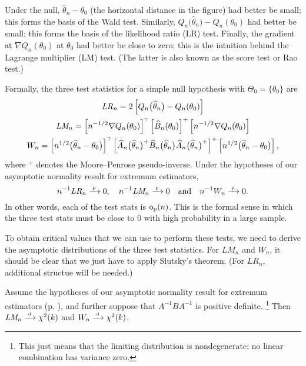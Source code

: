 \documentclass[11pt,letterpaper,reqno,oneside]{article}
\begin{document}
Under the null, $\widehat{\theta}_n-\theta_0$ (the horizontal distance in the figure) had better be small; this forms the basis of the Wald test. Similarly, $Q_n\bigl(\widehat{\theta}_n\bigr) - Q_n(\theta_0)$ had better be small; this forms the basis of the likelihood ratio (LR) test. Finally, the gradient at $\nabla Q_n(\theta_0)$ at $\theta_0$ had better be close to zero; this is the intuition behind the Lagrange multiplier (LM) test. (The latter is also known as the score test or Rao test.)

Formally, the three test statistics for a simple null hypothesis with $\Theta_0 = \{ \theta_0 \}$ are
%
\begin{gather*}
	\mathit{LR}_n
	= 2 \left[ Q_n\bigl( \widehat{\theta}_n \bigr) - Q_n(\theta_0) \right]
	\\
	\textit{LM}_n
	= \left[ n^{-1/2} \nabla Q_n(\theta_0) \right]^{\scriptscriptstyle \top}
	\left[ \widehat{B}_n(\theta_0) \right]^+
	\left[ n^{-1/2} \nabla Q_n(\theta_0) \right]
	\\
	W_n
	= \left[ n^{1/2} \bigl( \widehat{\theta}_n - \theta_0 \bigr) \right]^{\scriptscriptstyle \top}
	\left[ \widehat{A}_n\bigl( \widehat{\theta}_n \bigr)^+ 
	\widehat{B}_n\bigl( \widehat{\theta}_n \bigr)
	\widehat{A}_n\bigl( \widehat{\theta}_n \bigr)^+ \right]^+
	\left[ n^{1/2} \bigl( \widehat{\theta}_n - \theta_0 \bigr) \right] ,
\end{gather*}
%
where $^+$ denotes the Moore--Penrose pseudo-inverse. Under the hypotheses of our asymptotic normality result for extremum estimators,
%
\begin{equation*}
	n^{-1} \mathit{LR}_n \xrightarrow{{\scriptscriptstyle \mathrm{\;p\;}}} 0 ,
	\quad
	n^{-1} \textit{LM}_n \xrightarrow{{\scriptscriptstyle \mathrm{\;p\;}}} 0 
	\quad\text{and}\quad
	n^{-1} W_n \xrightarrow{{\scriptscriptstyle \mathrm{\;p\;}}} 0 .
\end{equation*}
%
In other words, each of the test stats is $\mathrm{o}_{\mathrm{p}}(n)$. This is the formal sense in which the three test stats must be close to 0 with high probability in a large sample.

To obtain critical values that we can use to perform these tests, we need to derive the asymptotic distributions of the three test statistics. For $\textit{LM}_n$ and $W_n$, it should be clear that we just have to apply Slutsky's theorem. (For $\mathit{LR}_n$, additional structue will be needed.)

\begin{proposition}
	Assume the hypotheses of our asymptotic normality result for extremum estimators (p. \pageref{proposition:asymptotic_normality}), and further suppose that $A^{-1} B A^{-1}$ is positive definite.%
		\footnote{This just means that the limiting distribution is nondegenerate: no linear combination has variance zero.}
	Then $\textit{LM}_n \xrightarrow{{\scriptscriptstyle \mathrm{\;d\;}}} \chi^2(k)$ and $W_n \xrightarrow{{\scriptscriptstyle \mathrm{\;d\;}}} \chi^2(k)$.
\end{proposition}
\end{document}
